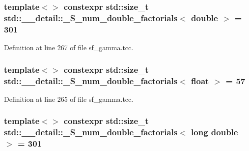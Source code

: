 \subsubsection[{\texorpdfstring{\+\_\+\+S\+\_\+num\+\_\+double\+\_\+factorials$<$ double $>$}{_S_num_double_factorials< double >}}]{\setlength{\rightskip}{0pt plus 5cm}template$<$$>$ constexpr std\+::size\+\_\+t {\bf std\+::\+\_\+\+\_\+detail\+::\+\_\+\+S\+\_\+num\+\_\+double\+\_\+factorials}$<$ double $>$ = 301}\hypertarget{namespacestd_1_1____detail_ae829eb6434a90060ee0650f1c71fb92d}{}\label{namespacestd_1_1____detail_ae829eb6434a90060ee0650f1c71fb92d}


Definition at line 267 of file sf\+\_\+gamma.\+tcc.

\subsubsection[{\texorpdfstring{\+\_\+\+S\+\_\+num\+\_\+double\+\_\+factorials$<$ float $>$}{_S_num_double_factorials< float >}}]{\setlength{\rightskip}{0pt plus 5cm}template$<$$>$ constexpr std\+::size\+\_\+t {\bf std\+::\+\_\+\+\_\+detail\+::\+\_\+\+S\+\_\+num\+\_\+double\+\_\+factorials}$<$ float $>$ = 57}\hypertarget{namespacestd_1_1____detail_ac55fdd5d901fcd9335503b16ec897444}{}\label{namespacestd_1_1____detail_ac55fdd5d901fcd9335503b16ec897444}


Definition at line 265 of file sf\+\_\+gamma.\+tcc.

\subsubsection[{\texorpdfstring{\+\_\+\+S\+\_\+num\+\_\+double\+\_\+factorials$<$ long double $>$}{_S_num_double_factorials< long double >}}]{\setlength{\rightskip}{0pt plus 5cm}template$<$$>$ constexpr std\+::size\+\_\+t {\bf std\+::\+\_\+\+\_\+detail\+::\+\_\+\+S\+\_\+num\+\_\+double\+\_\+factorials}$<$ long double $>$ = 301}\hypertarget{namespacestd_1_1____detail_a46272d8c219cfca2054da99471ed3711}{}\label{namespacestd_1_1____detail_a46272d8c219cfca2054da99471ed3711}


